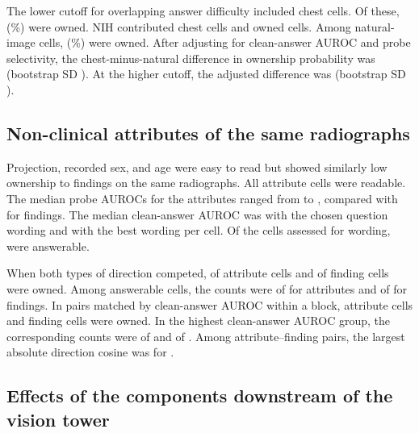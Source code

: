 The lower cutoff for overlapping answer difficulty included \jnCsEightyChestN{} chest cells. Of these, \jnCsEightyChestOwned{} (\jnCsEightyChestPct{}\%) were owned. NIH contributed \jnCsEightyNihN{} chest cells and \jnCsEightyNihOwned{} owned cells. Among \jnCsEightyNatN{} natural-image cells, \jnCsEightyNatOwned{} (\jnCsEightyNatPct{}\%) were owned. After adjusting for clean-answer AUROC and probe selectivity, the chest-minus-natural difference in ownership probability was \jnCsEightyAdj{} (bootstrap SD \jnCsEightyAdjSd{}). At the higher cutoff, the adjusted difference was \jnCsEightyFiveAdj{} (bootstrap SD \jnCsEightyFiveAdjSd{}).

\subsection{Non-clinical attributes of the same radiographs}
\label{sec:attributes}
\label{app:cf-attributes}

Projection, recorded sex, and age were easy to read but showed similarly low ownership to findings on the same radiographs. All \cfAttrReadable{} attribute cells were readable. The median probe AUROCs for the attributes ranged from \cfAttrAurocMin{} to \cfAttrAurocMax{}, compared with \cfAttrClinAuroc{} for findings. The median clean-answer AUROC was \cfAttrqWrittenAuroc{} with the chosen question wording and \cfAttrqSelectedAuroc{} with the best wording per cell. Of the \cfAttrqCells{} cells assessed for wording, \cfAttrqCapable{} were answerable.

When both types of direction competed, \cfAttrAllAttrOwned{} of \cfAttrAllAttrN{} attribute cells and \cfAttrAllClinOwned{} of \cfAttrAllClinN{} finding cells were owned. Among answerable cells, the counts were \cfAttrCapAttrOwned{} of \cfAttrCapAttrN{} for attributes and \cfAttrCapClinOwned{} of \cfAttrCapClinN{} for findings. In \cfAttrPairAttrN{} pairs matched by clean-answer AUROC within a block, \cfAttrPairAttrOwned{} attribute cells and \cfAttrPairClinOwned{} finding cells were owned. In the highest clean-answer AUROC group, the corresponding counts were \cfStratAttrTopOwned{} of \cfStratAttrTopN{} and \cfStratFindTopOwned{} of \cfStratFindTopN{}. Among \cfAttrCosPairs{} attribute--finding pairs, the largest absolute direction cosine was \cfAttrCosMax{} for \cfAttrCosPairLabel{}.

\subsection{Effects of the components downstream of the vision tower}
\label{sec:reader}
\label{app:cf-reader}

